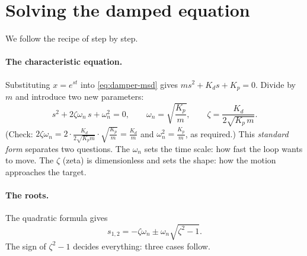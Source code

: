 \section{Solving the damped equation}

We follow the recipe of  step by step.

\paragraph{The characteristic equation.} Substituting $x = e^{st}$ into \cref{eq:damper-msd} gives $m s^2 + K_d s + K_p = 0$. Divide by $m$ and introduce two new parameters:
\begin{equation}\label{eq:damper-std}
  s^2 + 2\zeta\omega_n\,s + \omega_n^2 = 0,\qquad
  \omega_n = \sqrt{\frac{K_p}{m}},\qquad
  \zeta = \frac{K_d}{2\sqrt{K_p\,m}} .
\end{equation}
(Check: $2\zeta\omega_n = 2\cdot\frac{K_d}{2\sqrt{K_pm}}\cdot\sqrt{\frac{K_p}{m}} = \frac{K_d}{m}$ and $\omega_n^2 = \frac{K_p}{m}$, as required.) This \emph{standard form} separates two questions. The  $\omega_n$ sets the time scale: how fast the loop wants to move. The  $\zeta$ (zeta) is dimensionless and sets the shape: how the motion approaches the target.

\paragraph{The roots.} The quadratic formula gives
\begin{equation}\label{eq:damper-poles}
  s_{1,2} = -\zeta\omega_n \pm \omega_n\sqrt{\zeta^2 - 1} .
\end{equation}
The sign of $\zeta^2 - 1$ decides everything: three cases follow.

